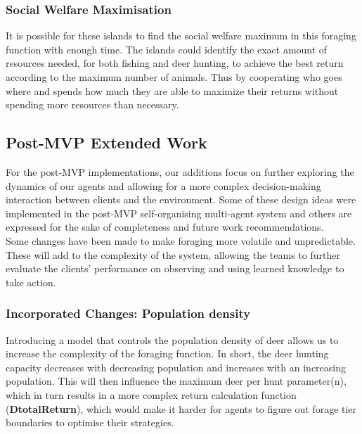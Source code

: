 \subsubsection{Social Welfare Maximisation}

It is possible for these islands to find the social welfare maximum in this foraging function with enough time. The islands could identify the exact amount of resources needed, for both fishing and deer hunting, to achieve the best return according to the maximum number of animals. Thus by cooperating who goes where and spends how much they are able to maximize their returns without spending more resources than necessary.\\

\subsection{Post-MVP Extended Work}

For the post-MVP implementations, our additions focus on further exploring the dynamics of our agents and allowing for a more complex decision-making interaction between clients and the environment. Some of these design ideas were implemented in the post-MVP self-organising multi-agent system and others are expressed for the sake of completeness and future work recommendations.\\

Some changes have been made to make foraging more volatile and unpredictable. These will add to the complexity of the system, allowing the teams to further evaluate the clients’ performance on observing and using learned knowledge to take action.\\

\subsubsection{Incorporated Changes: Population density}

Introducing a model that controls the population density of deer allows us to increase the complexity of the foraging function. In short, the deer hunting capacity decreases with decreasing population and increases with an increasing population. This will then influence the maximum deer per hunt parameter(n), which in turn results in a more complex return calculation function (\textbf{DtotalReturn}), which would make it harder for agents to figure out forage tier boundaries to optimise their strategies.\\

